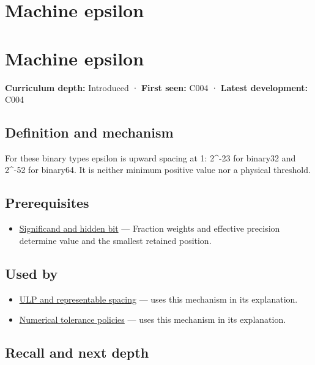 \hypertarget{appendix-390ea641da54}{}
\section*{Machine epsilon}
\section{Machine epsilon}\label{appendix-390ea641da54-machine-epsilon}

\textbf{Curriculum depth:} Introduced · \textbf{First seen:} C004 · \textbf{Latest development:} C004

\subsection{Definition and mechanism}\label{appendix-390ea641da54-definition-and-mechanism}

For these binary types epsilon is upward spacing at 1: 2\^{}-23 for binary32 and 2\^{}-52 for binary64. It is neither minimum positive value nor a physical threshold.

\subsection{Prerequisites}\label{appendix-390ea641da54-prerequisites}

\begin{itemize}
\tightlist
\item
  \hyperref[appendix-a24fd710cf67]{Significand and hidden bit} --- Fraction weights and effective precision determine value and the smallest retained position.
\end{itemize}

\subsection{Used by}\label{appendix-390ea641da54-used-by}

\begin{itemize}
\tightlist
\item
  \hyperref[appendix-14bab4cab9d4]{ULP and representable spacing} --- uses this mechanism in its explanation.
\item
  \hyperref[appendix-0ec599f8ba27]{Numerical tolerance policies} --- uses this mechanism in its explanation.
\end{itemize}

\subsection{Recall and next depth}\label{appendix-390ea641da54-recall-and-next-depth}


